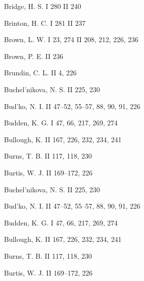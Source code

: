 \begin{theauthorindex}
\item Bridge, H. S. I 280 II 240
\item Brinton, H. C. I 281 II 237
\item Brown, L. W. I 23, 274 II 208, 212, 226, 236
\item Brown, P. E. II 236
\item Brundin, C. L. II 4, 226
\item Buchel'nikova, N. S. II 225, 230
\item Bud'ko, N. I. II 47--52, 55--57, 88, 90, 91, 226
\item Budden, K. G. I 47, 66, 217, 269, 274
\item Bullough, K. II 167, 226, 232, 234, 241
\item Burns, T. B. II 117, 118, 230
\item Burtis, W. J. II 169--172, 226
\item Buchel'nikova, N. S. II 225, 230
\item Bud'ko, N. I. II 47--52, 55--57, 88, 90, 91, 226
\item Budden, K. G. I 47, 66, 217, 269, 274
\item Bullough, K. II 167, 226, 232, 234, 241
\item Burns, T. B. II 117, 118, 230
\item Burtis, W. J. II 169--172, 226
\end{theauthorindex}

